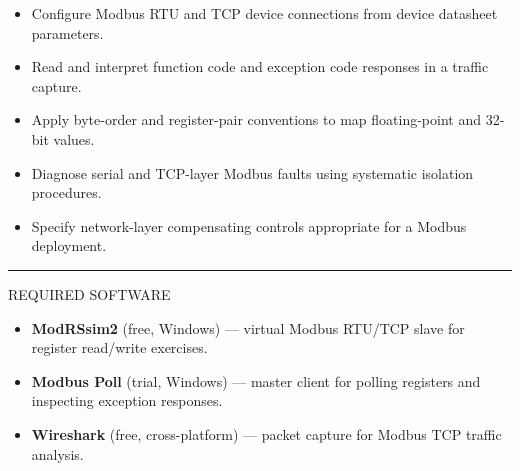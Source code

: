 \documentclass[10pt]{article}
\begin{document}
\begin{itemize}\small
  \item Configure Modbus RTU and TCP device connections from device datasheet parameters.
  \item Read and interpret function code and exception code responses in a traffic capture.
  \item Apply byte-order and register-pair conventions to map floating-point and 32-bit values.
  \item Diagnose serial and TCP-layer Modbus faults using systematic isolation procedures.
  \item Specify network-layer compensating controls appropriate for a Modbus deployment.
\end{itemize}

\smallskip
{\color{mnavy}\rule{\linewidth}{0.4pt}}
\smallskip
{\small\sffamily\color{mgray}\MakeUppercase{Required Software}}
\smallskip

\begin{itemize}\small
  \item \textbf{ModRSsim2} (free, Windows) — virtual Modbus RTU/TCP slave for register read/write exercises.
  \item \textbf{Modbus Poll} (trial, Windows) — master client for polling registers and inspecting exception responses.
  \item \textbf{Wireshark} (free, cross-platform) — packet capture for Modbus TCP traffic analysis.
\end{itemize}


\vfill

\end{document}
